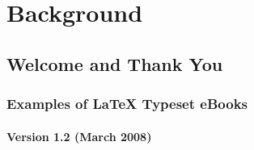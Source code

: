 \chapter{Background}
\label{Chapter2}

\section{Welcome and Thank You}

\subsection{Examples of \LaTeX{} Typeset eBooks}

\subsubsection*{Version 1.2 (March 2008)}
